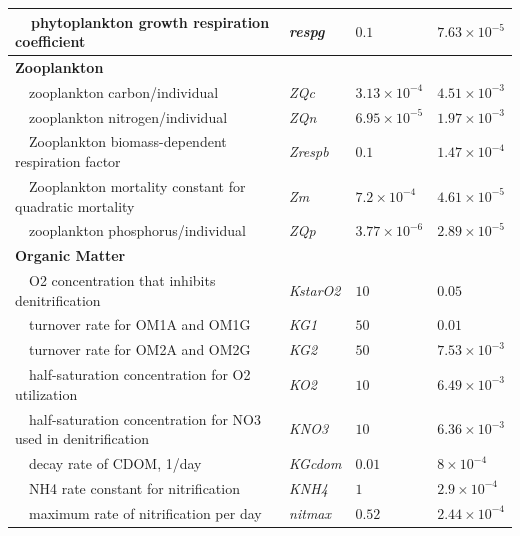 \documentclass[letterpaper,12pt,oneside]{article}\usepackage[]{graphicx}\usepackage[]{color}
\begin{document}
\begin{table}[!tbp]
{\begin{center}
\begin{tabular}{llll}
~~phytoplankton growth respiration coefficient&\textit{respg}&$0.1$&$7.63\times 10^{-5}$\tabularnewline
\hline
{\bfseries Zooplankton}&&&\tabularnewline
~~zooplankton carbon/individual&\textit{ZQc}&$3.13\times 10^{-4}$&$4.51\times 10^{-3}$\tabularnewline
~~zooplankton nitrogen/individual&\textit{ZQn}&$6.95\times 10^{-5}$&$1.97\times 10^{-3}$\tabularnewline
~~Zooplankton biomass-dependent respiration factor&\textit{Zrespb}&$0.1$&$1.47\times 10^{-4}$\tabularnewline
~~Zooplankton mortality constant for quadratic mortality&\textit{Zm}&$7.2\times 10^{-4}$&$4.61\times 10^{-5}$\tabularnewline
~~zooplankton phosphorus/individual&\textit{ZQp}&$3.77\times 10^{-6}$&$2.89\times 10^{-5}$\tabularnewline
\hline
{\bfseries Organic Matter}&&&\tabularnewline
~~O2 concentration that inhibits denitrification&\textit{KstarO2}&$10$&$0.05$\tabularnewline
~~turnover rate for OM1A and OM1G&\textit{KG1}&$50$&$0.01$\tabularnewline
~~turnover rate for OM2A and OM2G&\textit{KG2}&$50$&$7.53\times 10^{-3}$\tabularnewline
~~half-saturation concentration for O2 utilization&\textit{KO2}&$10$&$6.49\times 10^{-3}$\tabularnewline
~~half-saturation concentration for NO3 used in denitrification&\textit{KNO3}&$10$&$6.36\times 10^{-3}$\tabularnewline
~~decay rate of CDOM, 1/day&\textit{KGcdom}&$0.01$&$8\times 10^{-4}$\tabularnewline
~~NH4 rate constant for nitrification&\textit{KNH4}&$1$&$2.9\times 10^{-4}$\tabularnewline
~~maximum rate of nitrification per day&\textit{nitmax}&$0.52$&$2.44\times 10^{-4}$\tabularnewline
\hline
\end{tabular}\end{center}}

\end{table}
\end{document}
